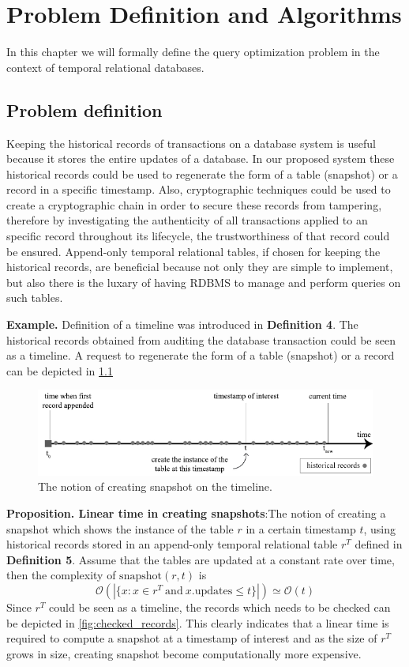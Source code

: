 \chapter{Problem Definition and Algorithms}

In this chapter we will formally define the query optimization problem in the
context of temporal relational databases.

\section{Problem definition}
Keeping the historical records of transactions on a database system is useful because it stores the entire updates of a database. In our proposed system these historical records could be used to regenerate the form of a table (snapshot) or a record in a specific timestamp. Also, cryptographic techniques could be used to create a cryptographic chain in order to secure these records from tampering, therefore by investigating the authenticity of all transactions applied to an specific record throughout its lifecycle, the trustworthiness of that record could be ensured. Append-only temporal relational tables, if chosen for keeping the historical records, are beneficial because not only they are simple to implement, but also there is the luxary of having RDBMS to manage and perform queries on such tables.

\textbf{Example.} Definition of a timeline was introduced in \textbf{Definition 4}. The historical records obtained from auditing the database transaction could be seen as a timeline. A request to regenerate the form of a table (snapshot) or a record can be depicted in \ref{fig:snapshot_notion}

\begin{figure}
	\centering
	\includegraphics[width=\textwidth]{figs/snapshot_notion.pdf}
	\caption{The notion of creating snapshot on the timeline.}
	\label{fig:snapshot_notion}
\end{figure}


\textbf{Proposition. Linear time in creating snapshots}:The notion of creating a snapshot which shows the instance of the table $r$ in a certain timestamp $t$, using historical records stored in an append-only temporal relational table $r^T$ defined in \textbf{Definition 5}. Assume that the tables are updated at a constant rate over time, then the complexity of $\mathrm{snapshot}(r, t)$ is $$\mathcal{O}(|\{x: x\in r^T\mathrm{\ and\ } x.\mathrm{updates} \leq t\}|)\simeq \mathcal{O}(t)$$
Since $r^T$ could be seen as a timeline, the records which needs to be checked can be depicted in \ref{fig:checked_records}. This clearly indicates that a linear time is required to compute a snapshot at a timestamp of interest and as the size of $r^T$ grows in size, creating snapshot become computationally more expensive.

